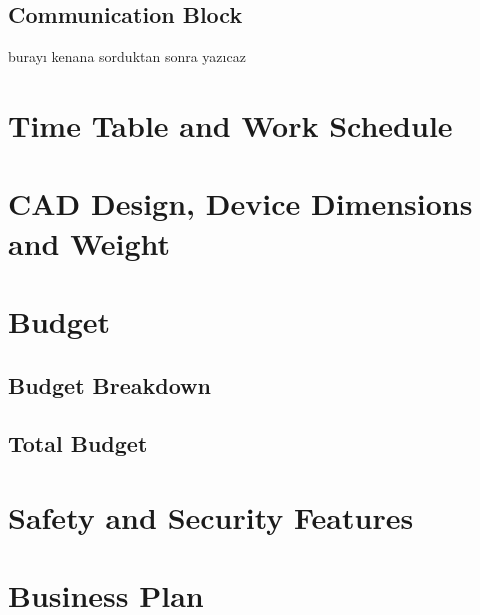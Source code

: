 \documentclass[12pt,a4paper]{article}
\begin{document}
   \subsection{Communication Block}
    \begin{flushleft}
     burayı kenana sorduktan sonra yazıcaz
    \end{flushleft}

 \section{Time Table and Work Schedule}
  \begin{flushleft}
   
  \end{flushleft}
  
 \section{CAD Design, Device Dimensions and Weight}
  \begin{flushleft}
   
  \end{flushleft}

 \section{Budget}
  \subsection{Budget Breakdown}
  \subsection{Total Budget}
  
  
 \section{Safety and Security Features}
  \begin{flushleft}
   
  \end{flushleft}

 \section{Business Plan}
 \begin{flushleft}
  
 \end{flushleft}
\end{document}
